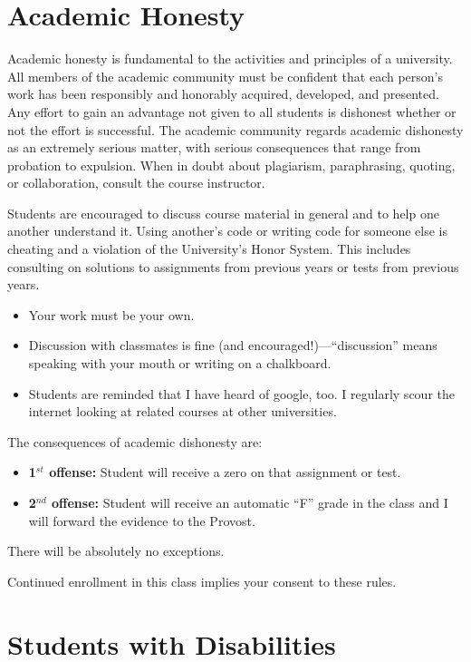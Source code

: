 \documentclass[11pt]{article}
\begin{document}
\section{Academic Honesty	}

Academic honesty is fundamental to the activities and principles of a university. All members of the academic community must be confident that each person's work has been responsibly and honorably acquired, developed, and presented. Any effort to gain an advantage not given to all students is dishonest whether or not the effort is successful. The academic community regards academic dishonesty as an extremely serious matter, with serious consequences that range from probation to expulsion. When in doubt about plagiarism, paraphrasing, quoting, or collaboration, consult the course instructor. 
	
	Students are encouraged to discuss course material in general and to help one another understand it. Using another's code or writing code for someone else is cheating and a violation of the University's Honor System. This includes consulting on solutions to assignments from previous years or tests from previous years. 
\begin{itemize}
\item Your work must be your own. 
\item Discussion with classmates is fine (and encouraged!)---``discussion'' means speaking with your mouth or writing on a chalkboard.
\item Students are reminded that I have heard of google, too. I regularly scour the internet looking at related courses at other universities.
\end{itemize}

The consequences of academic dishonesty are:
\begin{itemize}
\item[] {\bf 1$^{st}$ offense:} Student will receive a zero on that assignment or test.
\item[] {\bf 2$^{nd}$ offense:} Student will receive an automatic “F” grade in the class and I will forward the evidence to the Provost.
\end{itemize}
There will be absolutely no exceptions.

Continued enrollment in this class implies your consent to these rules.


\section{Students with Disabilities}
\end{document}
